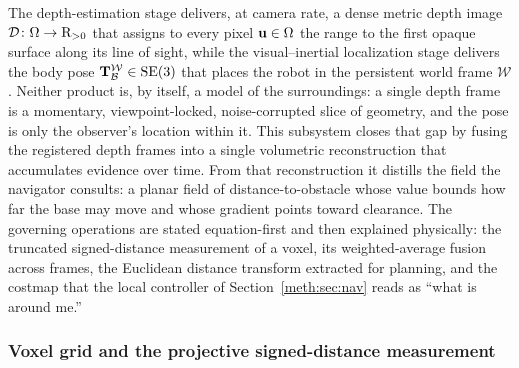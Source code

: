 The depth-estimation stage delivers, at camera rate, a dense metric depth image $\mathcal{D}\colon\Omega\to\mathrm{R}_{>0}$ that assigns to every pixel $\mathbf{u}\in\Omega$ the range to the first opaque surface along its line of sight, while the visual--inertial localization stage delivers the body pose $\mathbf{T}^{\mathcal W}_{\mathcal B}\in\mathrm{SE}(3)$ that places the robot in the persistent world frame $\mathcal W$. Neither product is, by itself, a model of the surroundings: a single depth frame is a momentary, viewpoint-locked, noise-corrupted slice of geometry, and the pose is only the observer's location within it. This subsystem closes that gap by fusing the registered depth frames into a single volumetric reconstruction that accumulates evidence over time. From that reconstruction it distills the field the navigator consults: a planar field of distance-to-obstacle whose value bounds how far the base may move and whose gradient points toward clearance. The governing operations are stated equation-first and then explained physically: the truncated signed-distance measurement of a voxel, its weighted-average fusion across frames, the Euclidean distance transform extracted for planning, and the costmap that the local controller of Section~\ref{meth:sec:nav} reads as ``what is around me.''

\subsubsection{Voxel grid and the projective signed-distance measurement}

